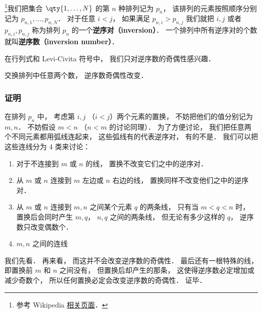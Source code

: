 
\begin{issues}
\issueDraft
\end{issues}


\footnote{参考 Wikipedia \href{https://en.wikipedia.org/wiki/Inversion_(discrete_mathematics)}{相关页面}．}我们把集合 $\qty{1,\dots,N}$ 的第 $n$ 种排列记为 $p_n$， 该排列的元素按照顺序分别记为 $p_{n,1}, \dots, p_{n,N}$． 对于任意 $i < j$， 如果满足 $p_{n,i} > p_{n,j}$ 我们就把 $i, j$ 或者 $p_{n,i}, p_{n,j}$ 称为排列 $p_n$ 的一个\textbf{逆序对（inversion）}． 一个排列中所有逆序对的个数就叫\textbf{逆序数（inversion number）}．

在行列式和 Levi-Civita 符号中， 我们只对逆序数的奇偶性感兴趣． 

\begin{theorem}{}
交换排列中任意两个数， 逆序数奇偶性改变． 
\end{theorem}

\subsubsection{证明}
在排列 $p_n$ 中， 考虑第 $i, j$ （$i < j$）两个元素的置换， 不妨把他们的值分别记为 $m, n$． 不妨假设 $m < n$ （$n < m$ 的讨论同理）． 为了方便讨论， 我们把任意两个不同元素都用弧线连起来， 这些弧线有的代表逆序对， 有的不是． 我们可以把这些连线分为 4 类来讨论：
\begin{enumerate}
\item 对于不连接到 $m$ 或 $n$ 的线， 置换不改变它们之中的逆序对．
\item 从 $m$ 或 $n$ 连接到 $m$ 左边或 $n$ 右边的线， 置换同样不改变他们之中的逆序对．
\item 从 $m$ 或 $n$ 连接到 $m, n$ 之间某个元素 $q$ 的两条线， 只有当 $m < q < n$ 时， 置换后会同时产生 $m,q$， $n,q$ 之间的两条线， 但无论有多少这样的 $q$， 逆序数只改变偶数个．
\item $m,n$ 之间的连线
\end{enumerate}

我们先看． 再来看， 而这并不会改变逆序数的奇偶性． 最后还有一根特殊的线， 即置换前 $m$ 和 $n$ 之间没有， 但置换后却产生的那条， 这使得逆序数必定增加或减少奇数个， 所以任何置换必定会改变逆序数的奇偶性． 证毕．
